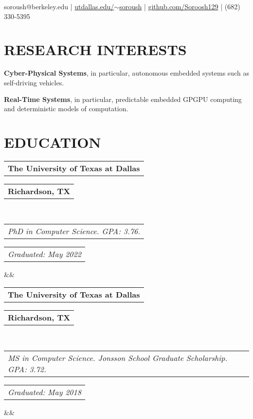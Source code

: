 \documentclass[10pt,letterpaper,sans]{moderncv}        %
\makeatletter
\newcommand*{\customcventry}[7][.25em]{
  \begin{tabular}{@{}l} 
    {\bfseries #4}
  \end{tabular}
  \hfill%
  \begin{tabular}{l@{}}
     {\bfseries #5}
  \end{tabular} \\
  \begin{tabular}{@{}l} 
    {\itshape #3}
  \end{tabular}
  \hfill%
  \begin{tabular}{l@{}}
     {\itshape #2}
  \end{tabular}
  \ifx&#7&%
  \else{\\%
    \begin{minipage}{\maincolumnwidth}%
      \small#7%
    \end{minipage}}\fi%
  \par\addvspace{#1}}
\makeatother
\begin{document}

\makecvtitle
\vspace*{-12mm}
%
\begin{flushleft}
\faEnvelopeO\hspace{0.00em} soroush@berkeley.edu |
\hspace{0.25em}\faGlobe\hspace{0.00em}
\href{https://www.utdallas.edu/~soroush/}{utdallas.edu/$\sim$soroush} |
\hspace{0.25em}\faGithub\hspace{0.00em} \href{https://github.com/Soroosh129}{github.com/Soroosh129} |
\hspace{0.25em}\faMobile\hspace{0.00em} (682) 330-5395
\end{flushleft}

\vspace{1mm}

\section{RESEARCH INTERESTS}
\textbf{Cyber-Physical Systems}, in particular, autonomous embedded systems such as self-driving vehicles.

\textbf{Real-Time Systems}, in particular, predictable embedded GPGPU computing and deterministic models of computation.



\section{EDUCATION}
{\customcventry{Graduated: May 2022}{PhD in Computer Science. GPA: 3.76.}{The
University of Texas at Dallas}{Richardson, TX}{}{}}
{\customcventry{Graduated: May 2018}{MS in Computer Science. Jonsson School
Graduate Scholarship. GPA: 3.72.}{The University of Texas at Dallas}{Richardson, TX}{}{}}
\end{document}
